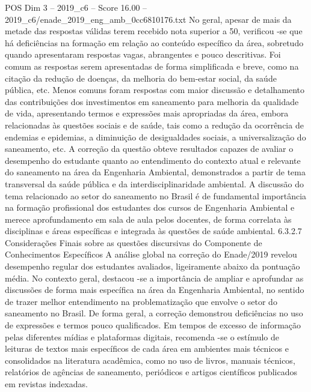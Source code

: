 \begin{textsample}{POS Dim 3 – 2019\_c6 – Score 16.00 – 2019\_c6/enade\_2019\_eng\_amb\_0cc6810176.txt}
No geral, apesar de mais da metade das respostas válidas terem recebido nota superior a 50, verificou -se que há deficiências na formação em relação ao conteúdo específico da área, sobretudo quando apresentaram respostas vagas, abrangentes e pouco descritivas.
Foi comum as respostas serem apresentadas de forma simplificada e breve, como na citação da redução de doenças, da melhoria do bem-estar social, da saúde pública, etc.
Menos comuns foram respostas com maior discussão e detalhamento das contribuições dos investimentos em saneamento para melhoria da qualidade de vida, apresentando termos e expressões mais apropriadas da área, embora relacionadas às questões sociais e de saúde, tais como a redução da ocorrência de endemias e epidemias, a diminuição de desigualdades sociais, a universalização do saneamento, etc.
A correção da questão obteve resultados capazes de avaliar o desempenho do estudante quanto ao entendimento do contexto atual e relevante do saneamento na área da Engenharia Ambiental, demonstrados a partir de tema transversal da saúde pública e da interdisciplinaridade ambiental.
A discussão do tema relacionado ao setor do saneamento no Brasil é de fundamental importância na formação profissional dos estudantes dos cursos de Engenharia Ambiental e merece aprofundamento em sala de aula pelos docentes, de forma correlata às disciplinas e áreas específicas e integrada às questões de saúde ambiental. 6.3.2.7 Considerações Finais sobre as questões discursivas do Componente de Conhecimentos Específicos A análise global na correção do Enade/2019 revelou desempenho regular dos estudantes avaliados, ligeiramente abaixo da pontuação média.
No contexto geral, destacou -se a importância de ampliar e aprofundar as discussões de forma mais específica na área da Engenharia Ambiental, no sentido de trazer melhor entendimento na problematização que envolve o setor do saneamento no Brasil.
De forma geral, a correção demonstrou deficiências no uso de expressões e termos pouco qualificados.
Em tempos de excesso de informação pelas diferentes mídias e plataformas digitais, recomenda -se o estímulo de leituras de textos mais específicos de cada área em ambientes mais técnicos e consolidados na literatura acadêmica, como no uso de livros, manuais técnicos, relatórios de agências de saneamento, periódicos e artigos científicos publicados em revistas indexadas.

\end{textsample}
